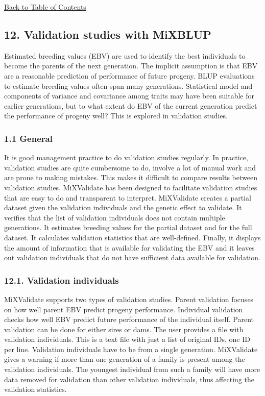 \hyperref[Tabl01]{Back to Table of Contents}

\newpage

\subsection{12. Validation studies with MiXBLUP}\label{Vali01}

Estimated breeding values (EBV) are used to identify the best
individuals to become the parents of the next generation. The implicit
assumption is that EBV are a reasonable prediction of performance of
future progeny. BLUP evaluations to estimate breeding values often span
many generations. Statistical model and components of variance and
covariance among traits may have been suitable for earlier generations,
but to what extent do EBV of the current generation predict the
performance of progeny well? This is explored in validation studies.

\subsubsection{1.1 General}\label{Vali02}

It is good management practice to do validation studies regularly. In
practice, validation studies are quite cumbersome to do, involve a lot
of manual work and are prone to making mistakes. This makes it difficult
to compare results between validation studies. MiXValidate has been
designed to facilitate validation studies that are easy to do and
transparent to interpret. MiXValidate creates a partial dataset given
the validation individuals and the genetic effect to validate. It
verifies that the list of validation individuals does not contain
multiple generations. It estimates breeding values for the partial
dataset and for the full dataset. It calculates validation statistics
that are well-defined. Finally, it displays the amount of information
that is available for validating the EBV and it leaves out validation
individuals that do not have sufficient data available for validation.

\subsubsection{12.1. Validation individuals}\label{Vali03}

MiXValidate supports two types of validation studies. Parent validation
focuses on how well parent EBV predict progeny performance. Individual
validation checks how well EBV predict future performance of the
individual itself. Parent validation can be done for either sires or
dams. The user provides a file with validation individuals. This is a
text file with just a list of original IDs, one ID per line. Validation
individuals have to be from a single generation. MiXValidate gives a
warning if more than one generation of a family is present among the
validation individuals. The youngest individual from such a family will
have more data removed for validation than other validation individuals,
thus affecting the validation statistics.

